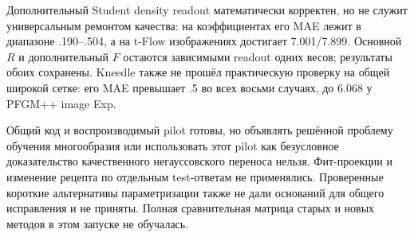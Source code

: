 Дополнительный Student density readout математически корректен, но не служит
универсальным ремонтом качества: на коэффициентах его MAE лежит в диапазоне
.190--.504, а на t-Flow изображениях достигает 7.001/7.899. Основной $R$ и
дополнительный $F$ остаются зависимыми readout одних весов; результаты обоих
сохранены. Kneedle также не прошёл практическую проверку на общей широкой сетке:
его MAE превышает .5 во всех восьми случаях, до 6.068 у PFGM++ image Exp.

Общий код и воспроизводимый pilot готовы, но объявлять решённой проблему
обучения многообразия или использовать этот pilot как безусловное доказательство
качественного негауссовского переноса нельзя. Фит-проекции и изменение рецепта
по отдельным test-ответам не применялись. Проверенные короткие альтернативы
параметризации также не дали оснований для общего исправления и не приняты.
Полная сравнительная матрица старых и новых методов в этом запуске не обучалась.
